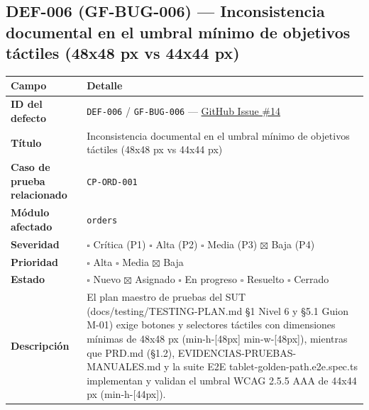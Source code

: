 \documentclass[10pt,a4paper]{article}
\newcounter{none}
\begin{document}
\endgroup\medskip


\subsection{DEF-006 (GF-BUG-006) --- Inconsistencia documental en el umbral mínimo de objetivos táctiles (48x48 px vs 44x44 px)}\label{def-006-gf-bug-006--inconsistencia-documental-en-el-umbral-muxednimo-de-objetivos-tuxe1ctiles-48x48-px-vs-44x44-px}

\begingroup\singlespacing\footnotesize\setlength{\parskip}{0pt}

{\def\LTcaptype{none} %
\begin{longtable}[]{@{}
  >{\raggedright\arraybackslash}p{}
  >{\raggedright\arraybackslash}p{}@{}}
\toprule\noalign{}
\begin{minipage}[b]{\linewidth}\raggedright
Campo
\end{minipage} & \begin{minipage}[b]{\linewidth}\raggedright
Detalle
\end{minipage} \\
\midrule\noalign{}
\endhead
\bottomrule\noalign{}
\endlastfoot
\textbf{ID del defecto} & \texttt{DEF-{}\allowbreak{}006} / \texttt{GF-{}\allowbreak{}BUG-{}\allowbreak{}006} --- \href{https://github.com/H3llz07/GastroForge-Testing/issues/14}{GitHub Issue \#14} \\
\textbf{Título} & Inconsistencia documental en el umbral mínimo de objetivos táctiles (48x48 px vs 44x44 px) \\
\textbf{Caso de prueba relacionado} & \texttt{CP-{}\allowbreak{}ORD-{}\allowbreak{}001} \\
\textbf{Módulo afectado} & \texttt{orders} \\
\textbf{Severidad} & \ensuremath{\square} Crítica (P1) \ensuremath{\square} Alta (P2) \ensuremath{\square} Media (P3) \ensuremath{\boxtimes} Baja (P4) \\
\textbf{Prioridad} & \ensuremath{\square} Alta \ensuremath{\square} Media \ensuremath{\boxtimes} Baja \\
\textbf{Estado} & \ensuremath{\square} Nuevo \ensuremath{\boxtimes} Asignado \ensuremath{\square} En progreso \ensuremath{\square} Resuelto \ensuremath{\square} Cerrado \\
\textbf{Descripción} & El plan maestro de pruebas del SUT (docs/testing/TESTING-PLAN.md §1 Nivel 6 y §5.1 Guion M-01) exige botones y selectores táctiles con dimensiones mínimas de 48x48 px (min-h-{[}48px{]} min-w-{[}48px{]}), mientras que PRD.md (§1.2), EVIDENCIAS-PRUEBAS-MANUALES.md y la suite E2E tablet-golden-path.e2e.spec.ts implementan y validan el umbral WCAG 2.5.5 AAA de 44x44 px (min-h-{[}44px{]}). \\

\end{longtable}}
\end{document}
